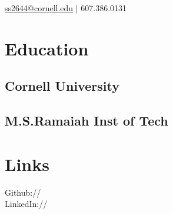 \documentclass[]{deedy-resume-openfont}
\begin{document}
%
%

%
%


{ %
\href{mailto:ss2644@cornell.edu}{ss2644@cornell.edu} | 607.386.0131
}

%
%

\begin{minipage}[t]{0.33\textwidth} 


\section{Education} 

\subsection{Cornell University}
\sectionsep

\subsection{M.S.Ramaiah Inst of Tech}
\sectionsep


\section{Links} 
Github:// \href{https://github.com/sairamprasad999}{} \\
LinkedIn://  \href{https://www.linkedin.com/in/sairamprasadreddy}{} \\
\sectionsep


\end{minipage}
\end{document}
